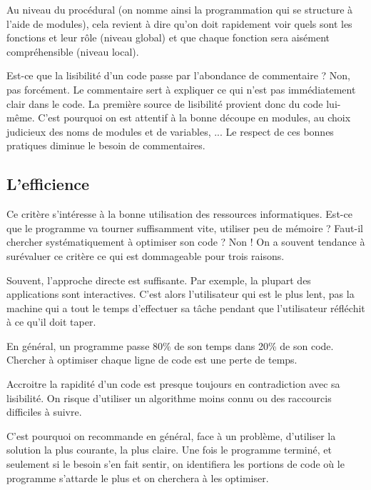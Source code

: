 	{
	Au niveau du procédural (on nomme ainsi la programmation qui se
	structure à l'aide de modules), cela revient à dire
	qu'on doit rapidement voir quels sont les fonctions et
	leur rôle (niveau global) et que chaque fonction sera aisément
	compréhensible (niveau local). }
	
	{
	Est-ce que la lisibilité d'un code passe par
	l'abondance de commentaire ? Non, pas forcément. Le
	commentaire sert à expliquer ce qui n'est pas
	immédiatement clair dans le code. La première source de lisibilité
	provient donc du code lui-même. C'est pourquoi on est
	attentif à la bonne découpe en modules, au choix judicieux des noms de
	modules et de variables, ... Le respect de ces bonnes pratiques diminue
	le besoin de commentaires.}
	
\subsection{L'efficience}

	{
	Ce critère s'intéresse à la bonne utilisation des
	ressources informatiques. Est-ce que le programme va tourner
	suffisamment vite, utiliser peu de mémoire ? Faut-il chercher
	systématiquement à optimiser son code ? Non ! On a souvent tendance à
	surévaluer ce critère ce qui est dommageable pour trois raisons.}

	\begin{liste}
	\item {
		Souvent, l'approche directe est suffisante. Par
		exemple, la plupart des applications sont interactives.
		C'est alors l’utilisateur qui est le plus lent, pas la
		machine qui a tout le temps d'effectuer sa tâche
		pendant que l’utilisateur réfléchit à ce qu'il doit
		taper.}
	\item {
		En général, un programme passe 80\% de son temps dans 20\% de son code.
		Chercher à optimiser chaque ligne de code est une perte de temps.}
	\item {
		Accroitre la rapidité d'un code est presque toujours en
		contradiction avec sa lisibilité. On risque d'utiliser un algorithme moins
		connu ou des raccourcis difficiles à suivre.}
	\end{liste}

	{
	C'est pourquoi on recommande en général, face à un
	problème, d'utiliser la solution la plus courante, la
	plus claire. Une fois le programme terminé, et seulement si le besoin
	s'en fait sentir, on identifiera les portions de code
	où le programme s'attarde le plus et on cherchera à
	les optimiser.}

